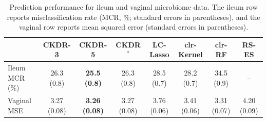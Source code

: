 \begin{table}%
    \centering
    \caption{Prediction performance for ileum and vaginal microbiome data. The ileum row reports misclassification rate (MCR, \%; standard errors in parentheses), and the vaginal row reports mean squared error (standard errors in parentheses).}
    \label{tab: real prediction}
    \small
    \begin{tabular}{lccccccc}
        \toprule
         & CKDR-3 & CKDR-5 & CKDR$^*$ & LC-Lasso & clr-Kernel & clr-RF & RS-ES \\
        \midrule
        Ileum MCR (\%) & 26.3 (0.8) & \textbf{25.5 (0.8)} & 26.3 (0.8) & 28.5 (0.7) & 28.2 (0.7) & 34.5 (0.9) & -- \\
        Vaginal MSE & 3.27 (0.08) & \textbf{3.26 (0.08)} & 3.27 (0.08) & 3.76 (0.06) & 3.41 (0.06) & 3.31 (0.07) & 4.20 (0.09) \\
        \bottomrule
    \end{tabular}%
\end{table}
